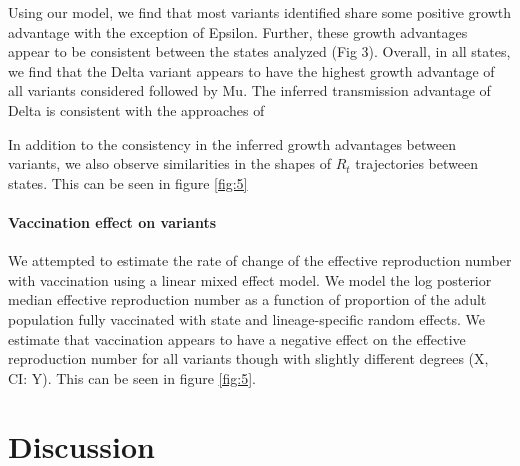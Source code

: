 \documentclass[12pt]{article}
\begin{document}
Using our model, we find that most variants identified share some positive growth advantage with the exception of Epsilon.
Further, these growth advantages appear to be consistent between the states analyzed (Fig 3).
Overall, in all states, we find that the Delta variant appears to have the highest growth advantage of all variants considered followed by Mu.
The inferred transmission advantage of Delta is consistent with the approaches of %

In addition to the consistency in the inferred growth advantages between variants, we also observe similarities in the shapes of $R_{t}$ trajectories between states. This can be seen in figure \ref{fig:5} %

\paragraph{Vaccination effect on variants}

We attempted to estimate the rate of change of the effective reproduction number with vaccination using a linear mixed effect model. We model the log posterior median effective reproduction number as a function of proportion of the adult population fully vaccinated with state and lineage-specific random effects. We estimate that vaccination appears to have a negative effect on the effective reproduction number for all variants though with slightly different degrees (X, CI: Y). This can be seen in figure \ref{fig:5}.


\section{Discussion}%

\end{document}
